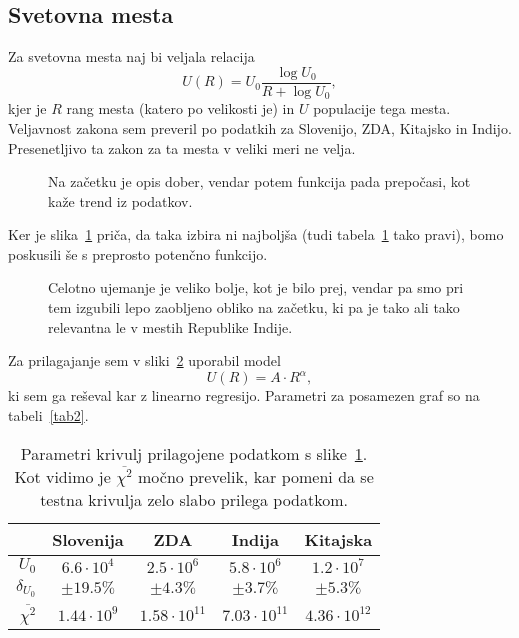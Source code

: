 \documentclass[a4 paper, 12pt]{article}
\begin{document}
\subsection{Svetovna mesta}

Za svetovna mesta naj bi veljala relacija
\[
	U(R) = U_0 \frac{\log U_0}{R + \log U_0},
\]
kjer je $R$ rang mesta (katero po velikosti je) in $U$ populacije tega mesta. Veljavnost zakona sem preveril po
podatkih za Slovenijo, ZDA, Kitajsko in Indijo. Presenetljivo ta zakon za ta mesta v veliki meri ne velja.
\begin{figure}[H]\centering
	
	\caption{Na za\v cetku je opis dober, vendar potem funkcija pada prepo\v casi, kot ka\v ze trend iz podatkov.}
	\label{gr:mest1}
\end{figure}
Ker je slika~\ref{gr:mest1} pri\v ca, da taka izbira ni najbolj\v sa (tudi tabela~\ref{tab1} tako pravi), bomo poskusili
\v se s preprosto poten\v cno funkcijo.
\begin{figure}[H]\centering
	
	\caption{Celotno ujemanje je veliko bolje, kot je bilo prej, vendar pa smo pri tem izgubili lepo
		zaobljeno obliko na za\v cetku, ki pa je tako ali tako relevantna le v mestih Republike Indije.}
	\label{gr:mest2}
\end{figure}
Za prilagajanje sem v sliki~\ref{gr:mest2} uporabil model
\[
	U(R) = A \cdot R^{\alpha},
\]
ki sem ga re\v seval kar z linearno regresijo. Parametri za posamezen graf so na tabeli~\ref{tab2}.
\begin{table}[H]\centering
	\caption{Parametri krivulj prilagojene podatkom s slike~\ref{gr:mest1}. Kot vidimo je $\overline{\chi^2}$
		mo\v cno prevelik, kar pomeni da se testna krivulja zelo slabo prilega podatkom.}
	\begin{tabular}{r|c|c|c|c}
		& Slovenija & ZDA & Indija & Kitajska \\
		\hline
		$U_0$          & $6.6 \cdot 10^4$ & $2.5 \cdot 10^6$ & $5.8 \cdot 10^6$ & $1.2 \cdot10^7$ \\
		$\delta_{U_0}$ & $\pm 19.5 \%$    & $\pm 4.3 \%$     & $\pm 3.7 \%$     & $\pm 5.3 \%$ \\
		\hline
		$\overline{\chi^2}$ & $1.44 \cdot 10^{9}$ & $1.58 \cdot 10^{11}$ & $7.03 \cdot 10^{11}$ & $4.36 \cdot 10^{12}$
	\end{tabular}
	\label{tab1}
\end{table}
\end{document}
